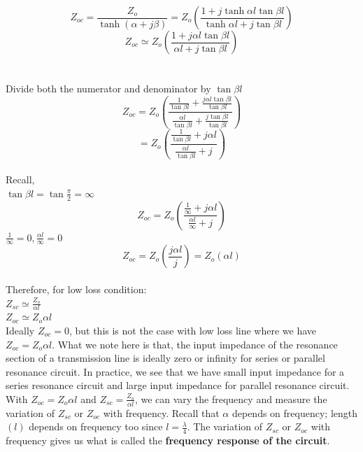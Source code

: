 \begin{equation}
Z_{oc} = \frac{Z_{o}}{\tanh(\alpha+j\beta)}=Z_{o}\left(\frac{1+j\tanh \alpha l\tan \beta l}{\tanh \alpha l+j\tan \beta l}\right)
\end{equation}
\begin{equation}
Z_{oc} \simeq Z_{o}\left(\frac{1+ j \alpha l\tan \beta l}{\alpha l+j\tan \beta l}\right)
\end{equation}\\\\
Divide both the numerator and denominator by $ \tan \beta l $
\begin{equation}
Z_{oc}=Z_{o}\left(\frac{\frac{1}{\tan \beta l}+\frac{j \alpha l\tan \beta l}{\tan \beta l}}{\frac{\alpha l}{\tan \beta l}+\frac{j\tan \beta l}{\tan \beta l}}\right)
\end{equation}
\begin{equation}
=Z_{o}\left(\frac{\frac{1}{\tan \beta l} + j \alpha l}{\frac{\alpha l}{\tan \beta l} + j}\right)
\end{equation}\\
Recall,\\
$ \tan\beta l =\tan\frac{\pi}{2}=\infty $\\
\begin{equation}
Z_{oc}=Z_{o}\left(\frac{\frac{1}{\infty} + j \alpha l}{\frac{\alpha l}{\infty} + j}\right)
\end{equation}
$ \frac{1}{\infty}=0, \frac{\alpha l}{\infty}=0 $\\
\begin{equation}
\boxed{	Z_{oc}=Z_{o}\left(\frac{j \alpha l}{j}\right)=Z_{o}(\alpha l)}\end{equation}\\
Therefore, for low loss condition:\\
 $ Z_{sc}\simeq \frac{Z_{o}}{\alpha l} $\\
$ Z_{oc} \simeq Z_{o} \alpha l $\\ 

Ideally $ Z_{oc}=0 $, but this is not the case with low loss line where we have  $ Z_{oc} = Z_{o} \alpha l $. What we note here is that, the input impedance of the resonance section of a transmission line is ideally zero or infinity for series or parallel resonance circuit. In practice, we see that we have small input impedance for a series resonance circuit and large input impedance for parallel resonance circuit.\\

With $ Z_{oc} =  Z_{o} \alpha l $ and  
$ Z_{sc}= \frac{Z_{o}}{\alpha l} $, we can vary the frequency and measure the variation of $ Z_{sc} $ or $ Z_{oc} $ with frequency. Recall that $ \alpha $ depends on frequency; length $(l)$ depends on frequency too since  $ l=\frac{\lambda}{4} $. The variation of $ Z_{sc} $  or  $ Z_{oc} $ with frequency gives us what is called the \textbf{frequency response of the circuit}.\\


